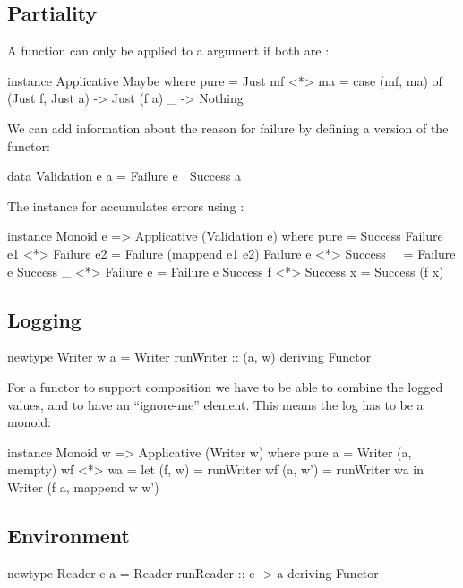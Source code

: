 \documentclass[DaoFP]{subfiles}
\begin{document}
\subsection{Partiality}
A  function can only be applied to a  argument if both are :
\begin{haskell}
instance Applicative Maybe where
  pure = Just
  mf <*> ma = 
    case (mf, ma) of
      (Just f, Just a) -> Just (f a)
      _ -> Nothing
\end{haskell}

We can add information about the reason for failure by defining a version of the  functor:
\begin{haskell}
data Validation e a = Failure e  | Success a
\end{haskell}
The  instance for  accumulates errors using :
\begin{haskell}
instance Monoid e => Applicative (Validation e) where
  pure = Success
  Failure e1 <*> Failure e2 = Failure (mappend e1 e2)
  Failure e  <*> Success _ = Failure e
  Success _  <*> Failure e  = Failure  e
  Success f  <*> Success x  = Success (f x)
\end{haskell}

\subsection{Logging}

\begin{haskell}
newtype Writer w a = Writer { runWriter :: (a, w) }
  deriving Functor
\end{haskell}

For a  functor to support composition we have to be able to combine the logged values, and to have an ``ignore-me'' element. This means the log has to be a monoid:
\begin{haskell}
instance Monoid w => Applicative (Writer w) where
  pure a = Writer (a, mempty)
  wf <*> wa = let (f, w)  = runWriter wf
                  (a, w') = runWriter wa
              in Writer (f a, mappend w w')
\end{haskell}

\subsection{Environment}
\begin{haskell}
newtype Reader e a = Reader { runReader :: e -> a }
  deriving Functor
\end{haskell}
\end{document}
